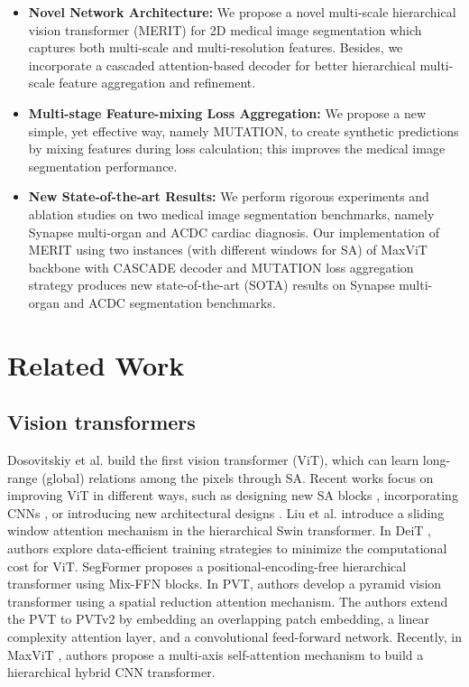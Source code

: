 \documentclass{midl}
\begin{document}
\begin{itemize}
  \item \textbf{Novel Network Architecture:} We propose a novel multi-scale hierarchical vision transformer (MERIT) for 2D medical image segmentation which captures both multi-scale and multi-resolution features. Besides, we incorporate a cascaded attention-based decoder for better hierarchical multi-scale feature aggregation and refinement.
\vspace{-0.5cm} \item \textbf{Multi-stage Feature-mixing Loss Aggregation:} We propose a new simple, yet effective way, namely MUTATION, to create synthetic predictions by mixing features during loss calculation; this improves the medical image segmentation performance.
\vspace{-0.1cm} \item \textbf{New State-of-the-art Results:} 
We perform rigorous experiments and ablation studies on two medical image segmentation benchmarks, namely Synapse multi-organ and ACDC cardiac diagnosis. Our implementation of MERIT using two instances (with different windows for SA) of MaxViT \cite{tu2022maxvit} backbone with CASCADE decoder and MUTATION loss aggregation strategy produces new state-of-the-art (SOTA) results on Synapse multi-organ and ACDC segmentation benchmarks.


\end{itemize}

\section{Related Work}
\label{sec:related_work}


\subsection{Vision transformers}



Dosovitskiy et al. \cite{dosovitskiy2020image} build the first vision transformer (ViT), which can learn long-range (global) relations among the pixels through SA. Recent works focus on improving ViT in different ways, such as designing new SA blocks \cite{liu2021swin, tu2022maxvit}, incorporating CNNs \cite{wang2022pvt, tu2022maxvit}, or introducing new architectural designs \cite{wang2021pyramid, xie2021segformer}. Liu et al. \cite{liu2021swin} introduce a sliding window attention mechanism in the hierarchical Swin transformer. In DeiT \cite{touvron2021training}, authors explore data-efficient training strategies to minimize the computational cost for ViT. 
SegFormer \cite{xie2021segformer} proposes a positional-encoding-free hierarchical transformer using Mix-FFN blocks. In PVT, authors \cite{wang2021pyramid} develop a pyramid vision transformer using a spatial reduction attention mechanism. The authors extend the PVT to PVTv2 \cite{wang2022pvt} by embedding an overlapping patch embedding, a linear complexity attention layer, and a convolutional feed-forward network. Recently, in MaxViT \cite{tu2022maxvit}, authors propose a multi-axis self-attention mechanism to build a hierarchical hybrid CNN transformer.
\end{document}
